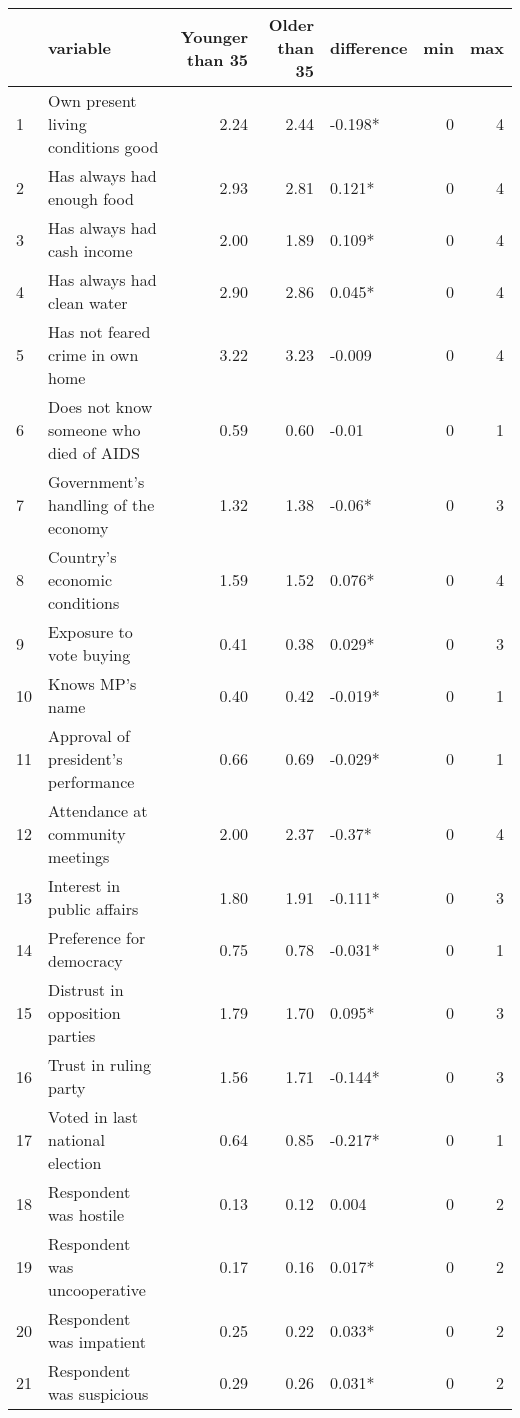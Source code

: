 \begingroup\fontsize{15}{17}\selectfont

\begin{tabular}{l|l|r|r|l|r|r}
\hline
  & variable & Younger than 35 & Older than 35 & difference & min & max\\
\hline
1 & Own present living conditions good & 2.24 & 2.44 & -0.198* & 0 & 4\\
\hline
2 & Has always had enough food & 2.93 & 2.81 & 0.121* & 0 & 4\\
\hline
3 & Has always had cash income & 2.00 & 1.89 & 0.109* & 0 & 4\\
\hline
4 & Has always had clean water & 2.90 & 2.86 & 0.045* & 0 & 4\\
\hline
5 & Has not feared crime in own home & 3.22 & 3.23 & -0.009 & 0 & 4\\
\hline
6 & Does not know someone who died of AIDS & 0.59 & 0.60 & -0.01 & 0 & 1\\
\hline
7 & Government's handling of the economy & 1.32 & 1.38 & -0.06* & 0 & 3\\
\hline
8 & Country's economic conditions & 1.59 & 1.52 & 0.076* & 0 & 4\\
\hline
\hline
9 & Exposure to vote buying & 0.41 & 0.38 & 0.029* & 0 & 3\\
\hline
10 & Knows MP's name & 0.40 & 0.42 & -0.019* & 0 & 1\\
\hline
11 & Approval of president's performance & 0.66 & 0.69 & -0.029* & 0 & 1\\
\hline
12 & Attendance at community meetings & 2.00 & 2.37 & -0.37* & 0 & 4\\
\hline
13 & Interest in public affairs & 1.80 & 1.91 & -0.111* & 0 & 3\\
\hline
14 & Preference for democracy & 0.75 & 0.78 & -0.031* & 0 & 1\\
\hline
15 & Distrust in opposition parties & 1.79 & 1.70 & 0.095* & 0 & 3\\
\hline
16 & Trust in ruling party & 1.56 & 1.71 & -0.144* & 0 & 3\\
\hline
17 & Voted in last national election & 0.64 & 0.85 & -0.217* & 0 & 1\\
\hline
\hline
18 & Respondent was hostile & 0.13 & 0.12 & 0.004 & 0 & 2\\
\hline
19 & Respondent was uncooperative & 0.17 & 0.16 & 0.017* & 0 & 2\\
\hline
20 & Respondent was impatient & 0.25 & 0.22 & 0.033* & 0 & 2\\
\hline
21 & Respondent was suspicious & 0.29 & 0.26 & 0.031* & 0 & 2\\

\end{tabular}
